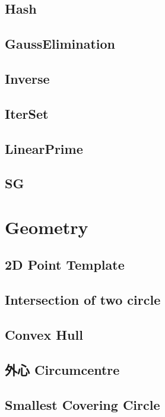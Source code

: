 \subsection{Hash}

\subsection{GaussElimination}

\subsection{Inverse}

\subsection{IterSet}

\subsection{LinearPrime}

\subsection{SG}


\section{Geometry}

\subsection{2D Point Template}

\subsection{Intersection of two circle}

\subsection{Convex Hull}

\subsection{外心 Circumcentre}

\subsection{Smallest Covering Circle}


